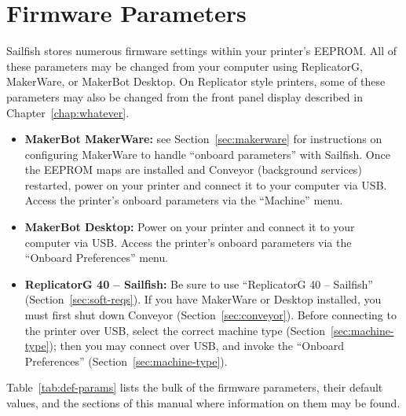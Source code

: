 
\chapter{Firmware Parameters} \label{chap:firmware-settings}

Sailfish stores numerous firmware settings within your printer's EEPROM.  All of these parameters may be changed from your computer using ReplicatorG, MakerWare, or MakerBot Desktop.  On Replicator style printers, some of these parameters may also be changed from the front panel display described in Chapter~\ref{chap:whatever}.

\begin{itemize}
\item \textbf{MakerBot MakerWare:} see Section~\ref{sec:makerware} for instructions on configuring MakerWare to handle ``onboard parameters'' with Sailfish. Once the EEPROM maps are installed and Conveyor (background services) restarted, power on your printer and connect it to your computer via USB.  Access the printer's onboard parameters via the ``Machine'' menu.
\item \textbf{MakerBot Desktop:} Power on your printer and connect it to your computer via USB.  Access the printer's onboard parameters via the ``Onboard Preferences'' menu.
\item \textbf{ReplicatorG 40 -- Sailfish:} Be sure to use ``ReplicatorG 40 -- Sailfish'' (Section~\ref{sec:soft-reqs}).  If you have MakerWare or Desktop installed, you must first shut down Conveyor (Section~\ref{sec:conveyor}).  Before connecting to the printer over USB, select the correct machine type (Section~\ref{sec:machine-type}); then you may connect over USB, and invoke the ``Onboard Preferences'' (Section~\ref{sec:machine-type}).
\end{itemize}

Table~\ref{tab:def-params} lists the bulk of the firmware parameters, their default values, and the sections of this manual where information on them may be found.

